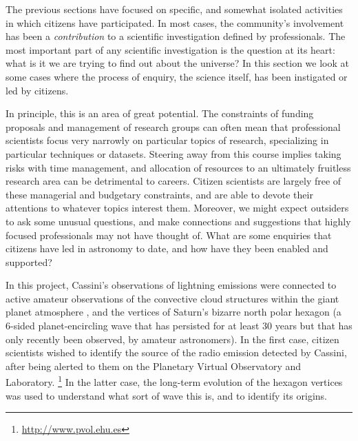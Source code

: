 \documentclass{ar2e}
\begin{document}
The previous sections have focused on specific, and somewhat  isolated
activities in which citizens have participated. In most cases, the community's
involvement has been a {\it contribution} to a scientific investigation defined
by professionals. The most important part of any scientific investigation is the
question at its heart: what is it we are trying to find out about the universe?
In this section we look at some cases where the process of enquiry, the science
itself, has been instigated or led by citizens.  

In principle, this is an area of great potential. The constraints of funding
proposals and management of research groups can often mean that professional
scientists focus very narrowly on particular topics of research, specializing in
particular techniques or datasets.  Steering away from this course implies
taking risks with time management, and allocation of resources to an ultimately
fruitless research area can be detrimental to careers.  Citizen scientists are
largely free of these managerial and budgetary constraints, and are able to
devote their attentions to whatever topics interest them. Moreover, we might
expect outsiders to ask some unusual questions, and make connections and
suggestions that highly focused professionals may not have thought of. What are
some enquiries that citizens have led in astronomy to date, and how have they
been enabled and supported?



In this project, Cassini's observations of lightning emissions were connected to
active amateur observations of the convective cloud structures within the giant
planet atmosphere \citep{11fischer},  and the vertices of Saturn's bizarre
north polar hexagon \citep{godfrey88} (a 6-sided planet-encircling wave that has
persisted for at least 30 years but that has only recently been observed, by
amateur astronomers).  In the first case, citizen scientists wished to identify
the source of the radio emission detected by Cassini, after being alerted to
them on the Planetary Virtual  Observatory and Laboratory.
\footnote{\url{http://www.pvol.ehu.es}} In the latter case, the long-term
evolution of the hexagon vertices was used to understand what sort of wave this
is, and to identify its origins.

\end{document}
